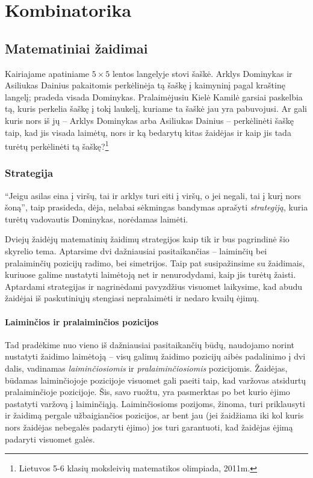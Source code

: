 \chapter{Kombinatorika}
\thispagestyle{empty}

\section{Matematiniai žaidimai}

Kairiajame apatiniame $5\times 5$ lentos langelyje stovi šaškė. Arklys
Dominykas ir Asiliukas Dainius pakaitomis perkėlinėja tą šaškę į kaimyninį
pagal kraštinę langelį; pradeda visada Dominykas. Pralaimėjusiu Kielė
Kamilė garsiai paskelbia tą, kuris perkelia šaškę į tokį laukelį, kuriame
ta šaškė jau yra pabuvojusi. Ar gali kuris nors iš jų – Arklys Dominykas
arba Asiliukas Dainius – perkėlinėti šaškę taip, kad jis visada laimėtų,
nors ir ką bedarytų kitas žaidėjas ir kaip jis tada turėtų perkėlinėti tą
šaškę?\footnote{Lietuvos 5-6 klasių moksleivių matematikos olimpiada,
2011m.}

\subsection{Strategija}

``Jeigu asilas eina į viršų, tai ir arklys turi eiti į viršų, o jei negali,
tai į kurį nors šoną'', taip prasideda, dėja, nelabai sėkmingas bandymas
aprašyti \emph{strategiją}, kuria turėtų vadovautis Dominykas, norėdamas
laimėti. 

Dviejų žaidėjų matematinių žaidimų strategijos kaip tik ir bus pagrindinė
šio skyrelio tema. Aptarsime dvi dažniausiai pasitaikančias -- laiminčių
bei pralaiminčių pozicijų radimo, bei simetrijos. Taip pat susipažinsime su
žaidimais, kuriuose galime nustatyti laimėtoją net ir nenurodydami, kaip
jis turėtų žaisti. Aptardami strategijas ir nagrinėdami pavyzdžius visuomet
laikysime, kad abudu žaidėjai iš paskutiniųjų stengiasi nepralaimėti ir
nedaro kvailų ėjimų. 

\subsubsection{Laiminčios ir pralaiminčios pozicijos}

Tad pradėkime nuo vieno iš dažniausiai pasitaikančių būdų, naudojamo norint
nustatyti žaidimo laimėtoją -- visų galimų žaidimo pozicijų aibės
padalinimo į dvi dalis, vadinamas \emph{laiminčiosiomis} ir
\emph{pralaiminčiosiomis} pozicijomis. Žaidėjas, būdamas
laiminčiojoje pozicijoje visuomet gali paeiti taip, kad varžovas atsidurtų
pralaiminčioje pozicijoje. Šis, savo ruožtu, yra pasmerktas po bet kurio
ėjimo pastatyti varžovą į laiminčiąją. Laiminčiosioms pozijoms, žinoma,
turi priklausyti ir žaidimą pergale užbaigiančios pozicijos, ar bent jau (jei
žaidžiama iki kol kuris nors žaidėjas nebegalės padaryti ėjimo) jos turi
garantuoti, kad žaidėjas ėjimą padaryti visuomet galės. 

